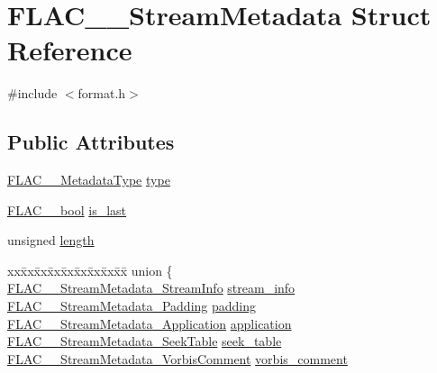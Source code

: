 \hypertarget{struct_f_l_a_c_____stream_metadata}{}\section{F\+L\+A\+C\+\_\+\+\_\+\+Stream\+Metadata Struct Reference}
\label{struct_f_l_a_c_____stream_metadata}


{\ttfamily \#include $<$format.\+h$>$}

\subsection*{Public Attributes}
\begin{DoxyCompactItemize}
\item 
\mbox{\hyperlink{group__flac__format_gac71714ba8ddbbd66d26bb78a427fac01}{F\+L\+A\+C\+\_\+\+\_\+\+Metadata\+Type}} \mbox{\hyperlink{struct_f_l_a_c_____stream_metadata_a39fd0655464f2cc7c9c37ae715088aec}{type}}
\item 
\mbox{\hyperlink{ordinals_8h_a95103469f1cbd78b8cf250194985b34e}{F\+L\+A\+C\+\_\+\+\_\+bool}} \mbox{\hyperlink{struct_f_l_a_c_____stream_metadata_aef40bbf85abe12e035f66f2d54ed316c}{is\+\_\+last}}
\item 
unsigned \mbox{\hyperlink{struct_f_l_a_c_____stream_metadata_a3fd615e41609837a5672f9081d9d2183}{length}}
\item 
\begin{tabbing}
xx\=xx\=xx\=xx\=xx\=xx\=xx\=xx\=xx\=\kill
union \{\\
\>\mbox{\hyperlink{struct_f_l_a_c_____stream_metadata___stream_info}{FLAC\_\_StreamMetadata\_StreamInfo}} \mbox{\hyperlink{struct_f_l_a_c_____stream_metadata_a827c8671721b01ed3007adbe81ae0c6b}{stream\_info}}\\
\>\mbox{\hyperlink{struct_f_l_a_c_____stream_metadata___padding}{FLAC\_\_StreamMetadata\_Padding}} \mbox{\hyperlink{struct_f_l_a_c_____stream_metadata_a202f0ed2fa1dae32893be6025838f651}{padding}}\\
\>\mbox{\hyperlink{struct_f_l_a_c_____stream_metadata___application}{FLAC\_\_StreamMetadata\_Application}} \mbox{\hyperlink{struct_f_l_a_c_____stream_metadata_af16b029d4a476aeb46f9a215e2cce462}{application}}\\
\>\mbox{\hyperlink{struct_f_l_a_c_____stream_metadata___seek_table}{FLAC\_\_StreamMetadata\_SeekTable}} \mbox{\hyperlink{struct_f_l_a_c_____stream_metadata_a3d27e525001843d173f8c97987663aa7}{seek\_table}}\\
\>\mbox{\hyperlink{struct_f_l_a_c_____stream_metadata___vorbis_comment}{FLAC\_\_StreamMetadata\_VorbisComment}} \mbox{\hyperlink{struct_f_l_a_c_____stream_metadata_a02662cb0ff19e8229dcd2384f708bae0}{vorbis\_comment}}\\

\end{tabbing}
\end{DoxyCompactItemize}
